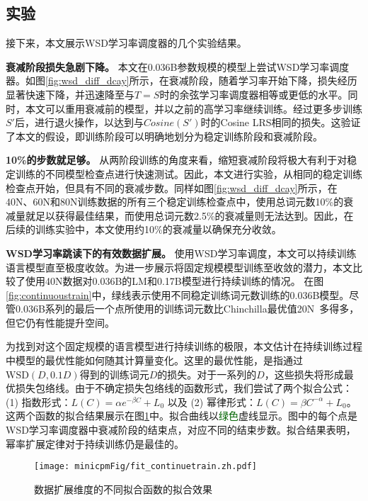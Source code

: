 \subsection{实验}
\label{sec:wsd_experiments_continoustrain}
接下来，本文展示WSD学习率调度器的几个实验结果。

\textbf{衰减阶段损失急剧下降。} 本文在0.036B参数规模的模型上尝试WSD学习率调度器。如图\ref{fig:wsd_diff_dcay}所示，在衰减阶段，随着学习率开始下降，损失经历显著快速下降，并迅速降至与$T = S$时的余弦学习率调度器相等或更低的水平。同时，本文可以重用衰减前的模型，并以之前的高学习率继续训练。经过更多步训练$S'$后，进行退火操作，以达到与$Cosine(S')$时的Cosine LRS相同的损失。这验证了本文的假设，即训练阶段可以明确地划分为稳定训练阶段和衰减阶段。

\textbf{10\%的步数就足够。} 从两阶段训练的角度来看，缩短衰减阶段将极大有利于对稳定训练的不同模型检查点进行快速测试。因此，本文进行实验，从相同的稳定训练检查点开始，但具有不同的衰减步数。同样如图\ref{fig:wsd_diff_dcay}所示，在40N、60N和80N训练数据的所有三个稳定训练检查点中，使用总词元数10\%的衰减量就足以获得最佳结果，而使用总词元数2.5\%的衰减量则无法达到。因此，在后续的训练实验中，本文使用约10\%的衰减量以确保充分收敛。

\textbf{WSD学习率跳读下的有效数据扩展。} 使用WSD学习率调度，本文可以持续训练语言模型直至极度收敛。为进一步展示将固定规模模型训练至收敛的潜力，本文比较了使用40N数据对0.036B的LM和0.17B模型进行持续训练的情况。
在图\ref{fig:continuoustrain}中，绿线表示使用不同稳定训练词元数训练的0.036B模型。尽管0.036B系列的最后一个点所使用的训练词元数比Chinchilla最优值20N~\citep{hoffmann2022training}多得多，但它仍有性能提升空间。


为找到对这个固定规模的语言模型进行持续训练的极限，本文估计在持续训练过程中模型的最优性能如何随其计算量变化。这里的最优性能，是指通过$\text{WSD}(D, 0.1D)$得到的训练词元$D$的损失。对于一系列的$D$，这些损失将形成最优损失包络线。由于不确定损失包络线的函数形式，我们尝试了两个拟合公式：(1) 指数形式：$L(C) = \alpha e^{-\beta C} + L_0$ 以及 (2) 幂律形式：$L(C) = \beta C^{-\alpha} + L_0$。这两个函数的拟合结果展示在图\ref{fig:fit_continue_train}中。拟合曲线以\textcolor{darkgreen}{绿色}虚线显示。图中的每个点是WSD学习率调度器中衰减阶段的结束点，对应不同的结束步数。拟合结果表明，幂率扩展定律对于持续训练仍是最佳的。 



\begin{figure}[!htbp]
    \centering
    \texttt{[image: minicpmFig/fit\_continuetrain.zh.pdf]}
    \caption{数据扩展维度的不同拟合函数的拟合效果}
    \label{fig:fit_continue_train}
\end{figure}



